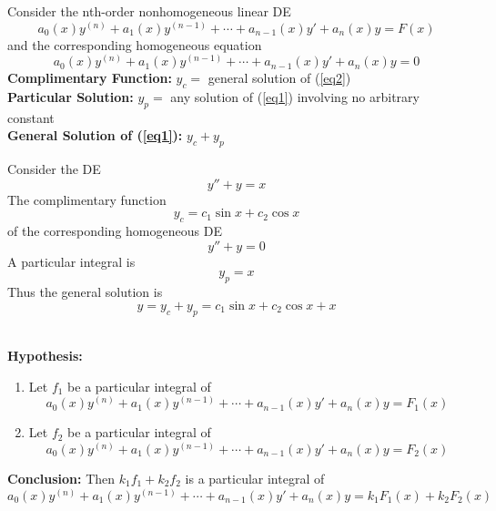 \begin{definition}{}{}
    Consider the nth-order nonhomogeneous linear DE
    \begin{equation} \tag{3.1.1}
        a_0(x)y^{(n)} + a_1(x)y^{(n-1)} + \cdots + a_{n-1}(x)y' + a_n(x)y = F(x)
    \end{equation}
    and the corresponding homogeneous equation
    \begin{equation} \tag{3.1.2}
        a_0(x)y^{(n)} + a_1(x)y^{(n-1)} + \cdots + a_{n-1}(x)y' + a_n(x)y = 0
    \end{equation}
    \textbf{Complimentary Function:} $y_c =$ general solution of (\ref{eq2})\\
    \textbf{Particular Solution:} $y_p =$ any solution of (\ref{eq1}) involving no arbitrary constant\\
    \textbf{General Solution of (\ref{eq1}):} $y_c + y_p$
\end{definition}

\begin{example}{}{}
    Consider the DE \[
        y'' + y = x
    \] The complimentary function \[
        y_c = c_1\sin x + c_2\cos x
    \] of the corresponding homogeneous DE \[
        y'' + y = 0
    \] A particular integral is \[
        y_p = x
    \] Thus the general solution is \[
        y = y_c + y_p = c_1\sin x + c_2\cos x + x
    \]
\end{example}

\begin{theorem}{}{}
    \\\textbf{Hypothesis:}
    \begin{enumerate}
        \item Let $f_1$ be a particular integral of
            \begin{equation}
                a_0(x)y^{(n)} + a_1(x)y^{(n-1)} + \cdots + a_{n-1}(x)y' + a_n(x)y = F_1(x)
            \end{equation}
        \item Let $f_2$ be a particular integral of
            \begin{equation}
                a_0(x)y^{(n)} + a_1(x)y^{(n-1)} + \cdots + a_{n-1}(x)y' + a_n(x)y = F_2(x)
            \end{equation}
    \end{enumerate}
    \textbf{Conclusion:} Then $k_1f_1 + k_2f_2$ is a particular integral of
    \begin{equation}
        a_0(x)y^{(n)} + a_1(x)y^{(n-1)} + \cdots + a_{n-1}(x)y' + a_n(x)y = k_1F_1(x) + k_2F_2(x)
    \end{equation}
\end{theorem}


